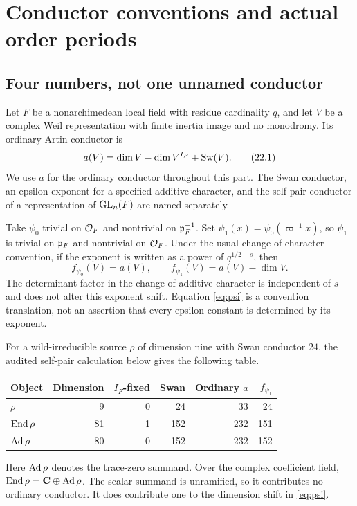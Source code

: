\section{Conductor conventions and actual order periods}\label{sec:conventions}
\subsection{Four numbers, not one unnamed conductor}
Let $F$ be a nonarchimedean local field with residue cardinality $q$, and let $V$ be a complex Weil representation with finite inertia image and no monodromy. Its ordinary Artin conductor is
\[
 a(V)=\dim V-\dim V^{I_F}+\operatorname{Sw}(V).
 \tag{22.1}\label{eq:artin}
\]
We use $a$ for the ordinary conductor throughout this part. The Swan conductor, an epsilon exponent for a specified additive character, and the self-pair conductor of a representation of $\operatorname{GL}_n(F)$ are named separately.

Take $\psi_0$ trivial on $\mathcal O_F$ and nontrivial on $\mathfrak p_F^{-1}$. Set $\psi_1(x)=\psi_0(\varpi^{-1}x)$, so $\psi_1$ is trivial on $\mathfrak p_F$ and nontrivial on $\mathcal O_F$. Under the usual change-of-character convention, if the exponent is written as a power of $q^{1/2-s}$, then
\[
 f_{\psi_0}(V)=a(V),\qquad f_{\psi_1}(V)=a(V)-\dim V.
 \tag{22.2}\label{eq:psi}
\]
The determinant factor in the change of additive character is independent of $s$ and does not alter this exponent shift. Equation \eqref{eq:psi} is a convention translation, not an assertion that every epsilon constant is determined by its exponent.

For a wild-irreducible source $\rho$ of dimension nine with Swan conductor $24$, the audited self-pair calculation below gives the following table.
\begin{center}\begin{tabular}{lrrrrr}\toprule
Object & Dimension & $I_F$-fixed & Swan & Ordinary $a$ & $f_{\psi_1}$\\\midrule
$\rho$ & 9 & 0 & 24 & 33 & 24\\
$\operatorname{End}\rho$ & 81 & 1 & 152 & 232 & 151\\
$\operatorname{Ad}\rho$ & 80 & 0 & 152 & 232 & 152\\\bottomrule
\end{tabular}\end{center}
Here $\operatorname{Ad}\rho$ denotes the trace-zero summand. Over the complex coefficient field, $\operatorname{End}\rho=\mathbf C\oplus\operatorname{Ad}\rho$. The scalar summand is unramified, so it contributes no ordinary conductor. It does contribute one to the dimension shift in \eqref{eq:psi}.

